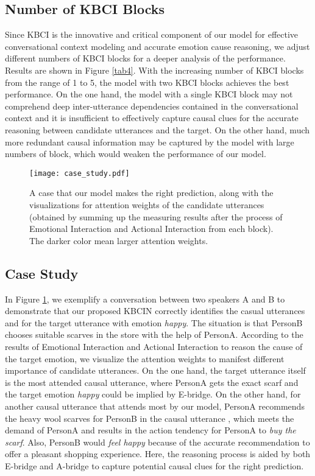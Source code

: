 \documentclass[letterpaper]{article} \usepackage{aaai23}  \usepackage{times}  \usepackage{helvet}  \usepackage{courier}  \usepackage[hyphens]{url}  \usepackage{graphicx} \urlstyle{rm} \def\UrlFont{\rm}  \usepackage{natbib}  \usepackage{caption} \frenchspacing  \setlength{\pdfpagewidth}{8.5in} \setlength{\pdfpageheight}{11in} \usepackage{algorithm}
\begin{document}
\subsection{Number of KBCI Blocks}
Since KBCI is the innovative and critical component of our model for effective conversational context modeling and accurate emotion cause reasoning, we adjust different numbers of KBCI blocks for a deeper analysis of the performance. Results are shown in Figure \ref{tab4}. With the increasing number of KBCI blocks from the range of 1 to 5, the model with two KBCI blocks achieves the best performance. On the one hand, the model with a single KBCI block may not comprehend deep inter-utterance dependencies contained in the conversational context and it is insufficient to effectively capture causal clues for the accurate reasoning between candidate utterances and the target. On the other hand, much more redundant causal information may be captured by the model with large numbers of block, which would weaken the performance of our model.

\begin{figure}[htbp]
\centering
\texttt{[image: case\_study.pdf]}
\caption{A case that our model makes the right prediction, along with the visualizations for attention weights of the candidate utterances (obtained by summing up the measuring results after the process of Emotional Interaction and Actional Interaction from each block). The darker color mean larger attention weights.}
\label{case_study}
\end{figure}

\subsection{Case Study}
In Figure \ref{case_study}, we exemplify a conversation between two speakers A and B to demonstrate that our proposed KBCIN correctly identifies the casual utterances  and  for the target utterance  with emotion \emph{happy}. The situation is that PersonB chooses suitable scarves in the store with the help of PersonA. According to the results of Emotional Interaction and Actional Interaction to reason the cause of the target emotion, we visualize the attention weights to manifest different importance of candidate utterances. On the one hand, the target utterance  itself is the most attended causal utterance, where PersonA gets the exact scarf and the target emotion \emph{happy} could be implied by E-bridge. On the other hand, for another causal utterance  that attends most by our model, PersonA recommends the heavy wool scarves for PersonB in the causal utterance , which meets the demand of PersonA and results in the action tendency for PersonA to \emph{buy the scarf}. Also, PersonB would \emph{feel happy} because of the accurate recommendation to offer a pleasant shopping experience. Here, the reasoning process is aided by both E-bridge and A-bridge to capture potential causal clues for the right prediction.
\end{document}
